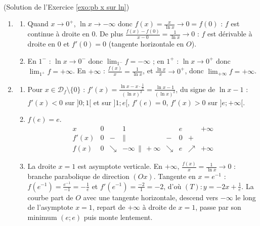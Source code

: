 \begin{corrige}
\begin{sol} ~ \\
(Solution de l'Exercice \ref{exo:pb x sur ln})
\begin{enumerate}
\item \begin{enumerate}
      \item Quand $x \to 0^+$, $\ln x \to -\infty$ donc $f(x) = \frac{x}{\ln x} \to 0 = f(0)$ : $f$ est continue \`a droite en $0$.
            De plus $\frac{f(x) - f(0)}{x - 0} = \frac{1}{\ln x} \to 0$ : $f$ est d\'erivable \`a droite en $0$ et $f'(0) = 0$
            (tangente horizontale en $O$).
      \item En $1^-$ : $\ln x \to 0^-$ donc $\lim_{1^-} f = -\infty$ ; en $1^+$ : $\ln x \to 0^+$ donc $\lim_{1^+} f = +\infty$.
            En $+\infty$ : $\frac{f(x)}{x} = \frac{1}{\ln x}$, et $\frac{\ln x}{x} \to 0^+$, donc $\lim_{+\infty} f = +\infty$.
      \end{enumerate}
\item \begin{enumerate}
      \item Pour $x \in \mathcal{D}_f \setminus \{0\}$ : $f'(x) = \frac{\ln x - x \cdot \frac{1}{x}}{(\ln x)^2} = \frac{\ln x - 1}{(\ln x)^2}$,
            du signe de $\ln x - 1$ : $f'(x) < 0$ sur $]0 ; 1[$ et sur $]1 ; e[$, $f'(e) = 0$, $f'(x) > 0$ sur $]e ; +\infty[$.
      \item $f(e) = e$.
            \[
            \begin{array}{c|ccccccc}
            x & 0 & & 1 & & e & & +\infty \\ \hline
            f'(x) & 0 & - & \| & - & 0 & + & \\ \hline
            f(x) & 0 & \searrow & -\infty \, \| \, +\infty & \searrow & e & \nearrow & +\infty
            \end{array}
            \]
      \item La droite $x = 1$ est asymptote verticale. En $+\infty$, $\frac{f(x)}{x} = \frac{1}{\ln x} \to 0$ : branche
            parabolique de direction $(Ox)$.
            Tangente en $x = e^{-1}$ : $f(e^{-1}) = \frac{e^{-1}}{-1} = -\frac{1}{e}$ et $f'(e^{-1}) = \frac{-2}{1} = -2$, d'o\`u
            $\boxed{(T) : y = -2x + \frac{1}{e}}$.
            La courbe part de $O$ avec une tangente horizontale, descend vers $-\infty$ le long de l'asymptote $x = 1$,
            repart de $+\infty$ \`a droite de $x = 1$, passe par son minimum $(e ; e)$ puis monte lentement.

\end{enumerate}
\end{enumerate}
\end{sol}
\end{corrige}
